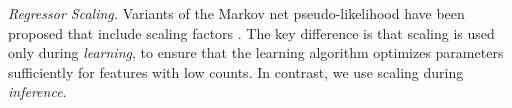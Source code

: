 \documentclass{article}
\begin{document}
{\em Regressor Scaling.} Variants of the Markov net pseudo-likelihood have been proposed that include scaling factors \cite{Domingos2009,Schulte2011}. 
The key difference is that scaling is used only during {\em learning}, to ensure that the learning algorithm optimizes parameters sufficiently for features with low counts. 
In contrast, we use scaling during {\em inference}. 



%
%
\end{document}
